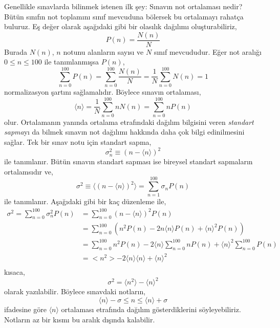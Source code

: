 \documentclass[a4paper,12pt, twoside]{article}
\begin{document}
Genellikle sınavlarda bilinmek istenen ilk şey: Sınavın not ortalaması nedir? Bütün sınıfın not toplamını sınıf mevcuduna bölersek bu ortalamayı rahatça buluruz. Eş değer olarak aşağıdaki gibi bir olasılık dağılımı oluşturabiliriz,
\begin{equation}
P\left( n\right) =\dfrac {N(n) }{N}
\label{eq:probability_distrubition_P}
\end{equation}
Burada $N(n)$, $n$ notunu alanların sayısı ve $N$ sınıf mevcududur. Eğer not aralığı $0\leq n \leq 100$ ile tanımlanmışsa $P(n)$,
\begin{equation}
\sum ^{100}_{n=0}P\left( n\right) =\sum ^{100}_{n=0}\dfrac {N(n) }{N}=\dfrac {1}{N}\sum ^{100}_{n=0}N(n) =1
\label{eq:normalization_P}
\end{equation}
normalizasyon şartını sağlamalıdır. Böylece sınavın ortalaması,
\begin{equation}
\langle n \rangle =\dfrac {1}{N}\sum ^{100}_{n=0}nN\left( n\right) =\sum ^{100}_{n=0}nP\left( n\right) 
\label{eq:average_grade}
\end{equation}
olur. Ortalamanın yanında ortalama etrafındaki dağılım bilgisini veren \emph{standart sapma}yı da bilmek sınavın not dağılımı hakkında daha çok bilgi edinilmesini sağlar. Tek bir sınav notu için standart sapma,
\begin{equation}
\sigma ^{2}_{n}\equiv(n-\langle n\rangle) ^{2}
\label{eq:standard_deviation_atom}
\end{equation}
ile tanımlanır. Bütün sınavın standart sapması ise bireysel standart sapmaların ortalamsıdır ve,
\begin{equation}
\sigma ^{2}\equiv \langle \left( n-\langle n\rangle \right) ^{2}\rangle =\sum ^{100}_{n=1}\sigma _{n}P\left( n\right) 
\label{eq:standard_deviation_exam}
\end{equation}
ile tanımlanır. Aşağıdaki gibi bir kaç düzenleme ile,
\begin{align*}
\sigma ^{2}=\sum ^{100}_{n=0}\sigma ^{2}_{n}P\left( n\right) &=\sum ^{100}_{n=0}\left(n -\langle n\rangle \right) ^{2}P\left( n\right) \\
&=\sum ^{100}_{n=0}\left( n^{2}P\left( n\right) -2n\langle n\rangle P\left( n\right) +\langle n\rangle ^{2}P\left( n\right) \right)\\
&=\sum ^{100}_{n=0}n^{2}P\left( n\right) -2 \langle n \rangle\sum ^{100}_{n=0}nP\left( n\right) +\langle n\rangle ^{2}\sum ^{100}_{n=0}P\left( n\right) \\
&=<n^{2}>-2 \langle n \rangle\langle n\rangle +\langle n\rangle ^{2}\\
\end{align*}
kısaca,
\begin{equation}
\sigma^2 = \langle n^{2}\rangle - \langle n \rangle^{2}
\end{equation}
olarak yazılabilir. Böylece sınavdaki notların,
\begin{equation*}
\langle n \rangle - \sigma \leq n \leq \langle n \rangle + \sigma
\end{equation*}
ifadesine göre $\langle n \rangle$ ortalaması etrafında dağılım gösterdiklerini söyleyebiliriz. Notların az bir kısmı bu aralık dışında kalabilir.
\end{document}
